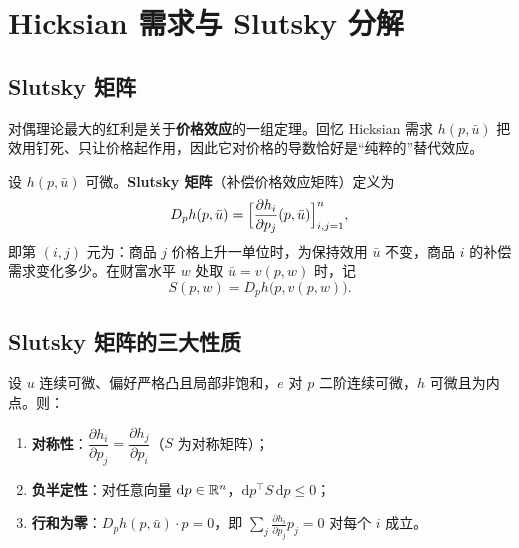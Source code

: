 \section{Hicksian 需求与 Slutsky 分解}
\subsection{Slutsky 矩阵}

对偶理论最大的红利是关于\textbf{价格效应}的一组定理。回忆 Hicksian 需求 $h(p,\bar u)$ 把效用钉死、只让价格起作用，因此它对价格的导数恰好是“纯粹的”替代效应。

\begin{definition}[Slutsky 矩阵]
设 $h(p,\bar u)$ 可微。\textbf{Slutsky 矩阵}（补偿价格效应矩阵）定义为
\[
 D_p h(p,\bar u)=\Bigl[\frac{\partial h_i}{\partial p_j}(p,\bar u)\Bigr]_{i,j=1}^{n},
\]
即第 $(i,j)$ 元为：商品 $j$ 价格上升一单位时，为保持效用 $\bar u$ 不变，商品 $i$ 的补偿需求变化多少。在财富水平 $w$ 处取 $\bar u=v(p,w)$ 时，记
\[
 S(p,w)=D_p h\bigl(p,v(p,w)\bigr).
\]
\end{definition}

\subsection{Slutsky 矩阵的三大性质}

\begin{theorem}\label{thm:slutsky-props}
设 $u$ 连续可微、偏好严格凸且局部非饱和，$e$ 对 $p$ 二阶连续可微，$h$ 可微且为内点。则：
\begin{enumerate}
\item \textbf{对称性}：$\dfrac{\partial h_i}{\partial p_j}=\dfrac{\partial h_j}{\partial p_i}$（$S$ 为对称矩阵）；
\item \textbf{负半定性}：对任意向量 $\mathrm dp\in\mathbb{R}^n$，$\mathrm dp^{\top}S\,\mathrm dp\le0$；
\item \textbf{行和为零}：$D_p h(p,\bar u)\cdot p=0$，即 $\sum_j\frac{\partial h_i}{\partial p_j}p_j=0$ 对每个 $i$ 成立。
\end{enumerate}
\end{theorem}

